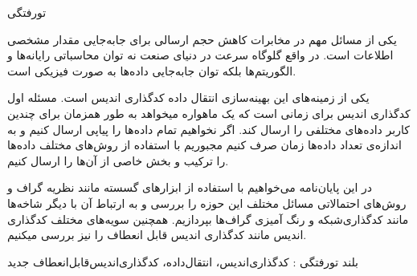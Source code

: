 


\begin{وسط‌چین}
\end{وسط‌چین}
‌تورفتگی

یکی از مسائل مهم در مخابرات کاهش حجم ارسالی برای جابه‌جایی مقدار مشخصی اطلاعات است. در واقع گلوگاه سرعت در دنیای صنعت نه توان محاسباتی رایانه‌ها و الگوریتم‌ها بلکه توان جابه‌جایی داده‌ها به صورت فیزیکی است.

یکی از زمینه‌های این بهینه‌سازی انتقال داده کدگذاری اندیس است. مسئله اول کدگذاری اندیس برای زمانی است که یک ماهواره میخواهد به طور همزمان برای چندین کاربر داده‌های مختلفی را ارسال کند. اگر نخواهیم تمام داده‌ها را پیاپی ارسال کنیم و به اندازه‌ی تعداد داده‌ها زمان صرف کنیم مجبوریم با استفاده از روش‌های مختلف داده‌ها را ترکیب و بخش خاصی از آن‌ها را ارسال کنیم.

در این پایان‌‌نامه می‌خواهیم با استفاده از ابزارهای گسسته مانند نظریه گراف و روش‌های احتمالاتی مسائل مختلف این حوزه را بررسی و به ارتباط آن با دیگر شاخه‌ها مانند کدگذار‌ی‌شبکه و رنگ آمیزی گراف‌ها بپردازیم. همچنین سویه‌های مختلف کدگذاری اندیس مانند کدگذاری اندیس قابل انعطاف را نیز بررسی میکنیم.
\myfootnote{\XeTeX}

‌بلند
‌تورفتگی :
کدگذاری‌اندیس، انتقال‌داده، کدگذاری‌اندیس‌قابل‌انعطاف
‌جدید
